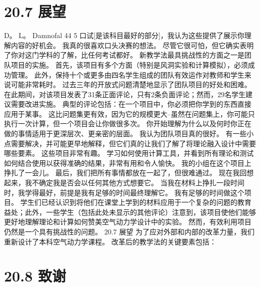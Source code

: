 \documentclass[UTF8,11pt,a4paper,openany,fontset=fandol]{ctexbook}
\begin{document}
\section{20.7 展望}
D。 L。 Damnofal 44 5 口试[是该科目最好的部分]，我认为这些提供了展示你理解内容的好机会。 我真的很喜欢口头决赛的想法。 尽管它很可怕，但它确实表明了你对这门学科的了解，比任何考试都好。 新教学法最具挑战性的方面之一是团队项目的实施。 首先，该项目有多个方面（特别是风洞实验和计算模拟），必须成功管理。 此外，保持十个或更多由四名学生组成的团队有效运作对教师和学生来说可能非常耗时。 过去三年的开放式问题清楚地显示了团队项目的好处和困难。 在此期间，对该项目发表了31条正面评论，只有2条负面评论；然而，29名学生建议需要改进实施。 典型的评论包括：在一个项目中，你必须把你学到的东西直接应用于某事。 这比问题集更有效，因为它的规模更大--虽然在问题集上，你可能只执行一次计算，但一个项目会让你做很多次。 你开始理解为什么以及何时你正在做的事情适用于更深层次、更亲密的层面。 我认为团队项目真的很好。 有一些小点需要解决，并可能更早地解释，但它们真的让我们了解了将理论融入设计中需要哪些要素。 这些项目非常有趣。 学习如何使用计算工具，并看到所有理论和测试如何结合使用以获得准确的结果，非常有用和令人愉快。 我的小组在这个项目上挣扎了一会儿。 最后，我们把所有事情都放在一起了，但很难通过。 现在我回想起来，我不确定我是否会以任何其他方式想要它。 当我在材料上挣扎一段时间时，我学得最好，前提是我有足够的时间最终理解它。 我有足够的时间做这个项目。 学生们已经认识到将他们在课堂上学到的材料应用于一个复杂的问题的教育益处；此外，一些学生（包括此处未显示的其他评论）注意到，该项目使他们能够更好地理解理论和计算如何赞美空气动力学设计中的实验。 然而，有效利用项目仍然是一个具有挑战性的问题。 20.7 展望 为了应对外部和内部的改革力量，我们重新设计了本科空气动力学课程。 改革后的教学法的关键要素包括：

\section{20.8 致谢}
\end{document}

